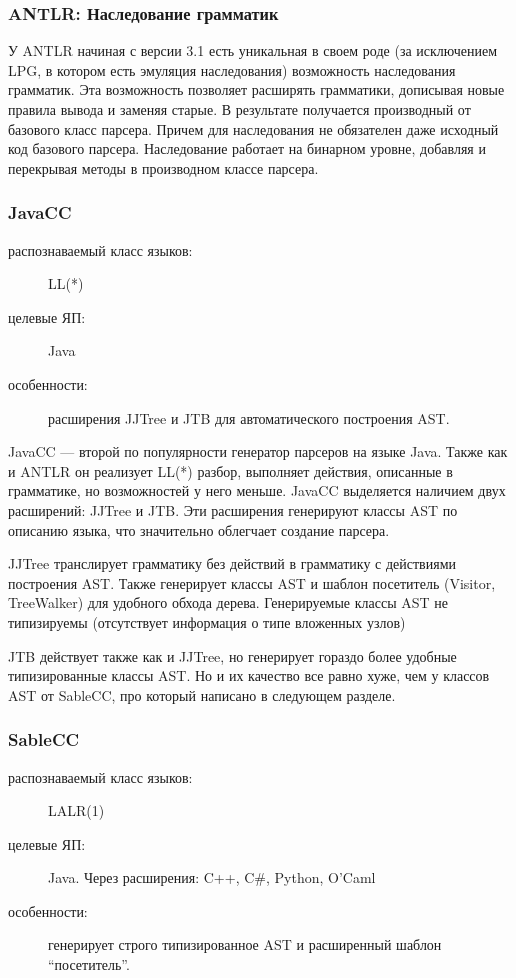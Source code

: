 \documentclass[a4paper,12pt,titlepage]{extarticle}
\begin{document}
\subsubsection*{ANTLR: Наследование грамматик}
У ANTLR начиная с версии 3.1 есть уникальная в своем роде (за исключением
LPG, в котором есть эмуляция наследования) возможность наследования грамматик. Эта
возможность позволяет расширять грамматики, дописывая новые правила вывода и заменяя старые. В результате
получается производный от базового класс парсера. Причем для наследования не
обязателен даже исходный код базового парсера. Наследование работает на
бинарном уровне, добавляя и перекрывая методы в производном классе парсера.

\subsubsection*{JavaCC}
\begin{description}
  \item[распознаваемый класс языков:] LL(*)
  \item[целевые ЯП:] Java
  \item[особенности:] расширения JJTree и JTB для автоматического построения
  AST.
\end{description}
JavaCC --- второй по популярности генератор парсеров на языке Java. Также как и
ANTLR он реализует LL(*) разбор, выполняет действия, описанные в грамматике, но
возможностей у него меньше. JavaCC выделяется наличием двух расширений: JJTree и
JTB. Эти расширения генерируют классы AST по описанию языка, что значительно
облегчает создание парсера.

JJTree транслирует грамматику без действий в грамматику с действиями
построения AST. Также генерирует классы AST и шаблон посетитель
(Visitor, TreeWalker) для удобного обхода дерева. Генерируемые классы AST не
типизируемы (отсутствует информация о типе вложенных узлов)

JTB действует также как и JJTree, но генерирует гораздо более удобные
типизированные классы AST. Но и их качество все равно хуже, чем у классов AST от
SableCC, про который написано в следующем разделе.

\subsubsection*{SableCC}
\label{sablecc}
\begin{description}
  \item[распознаваемый класс языков:] LALR(1)
  \item[целевые ЯП:] Java. Через расширения: C++, C\#, Python, O'Caml
  \item[особенности:] генерирует строго типизированное AST и расширенный
 	шаблон ``посетитель''.
\end{description}
\end{document}
